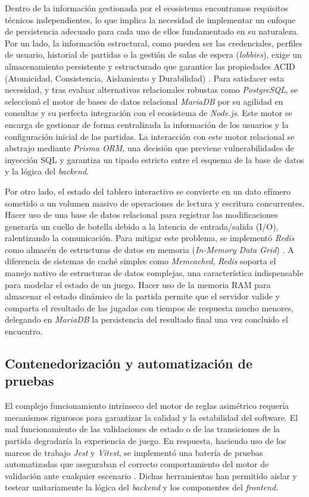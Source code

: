 Dentro de la información gestionada por el ecosistema encontramos requisitos técnicos independientes, lo que implica la necesidad de implementar un enfoque de persistencia adecuado para cada uno de ellos fundamentado en su naturaleza. Por un lado, la información estructural, como pueden ser las credenciales, perfiles de usuario, historial de partidas o la gestión de salas de espera (\textit{lobbies}), exige un almacenamiento persistente y estructurado que garantice las propiedades ACID (Atomicidad, Consistencia, Aislamiento y Durabilidad) \cite{elmasri_db}. Para satisfacer esta necesidad, y tras evaluar alternativas relacionales robustas como \textit{PostgreSQL}, se seleccionó el motor de bases de datos relacional \textit{MariaDB} por su agilidad en consultas y su perfecta integración con el ecosistema de \textit{Node.js}. Este motor se encarga de gestionar de forma centralizada la información de los usuarios y la configuración inicial de las partidas. La interacción con este motor relacional se abstrajo mediante \textit{Prisma ORM}, una decisión que previene vulnerabilidades de inyección SQL y garantiza un tipado estricto entre el esquema de la base de datos y la lógica del \textit{backend}.

Por otro lado, el estado del tablero interactivo se convierte en un dato efímero sometido a un volumen masivo de operaciones de lectura y escritura concurrentes. Hacer uso de una base de datos relacional para registrar las modificaciones generaría un cuello de botella debido a la latencia de entrada/salida (I/O), ralentizando la comunicación. Para mitigar este problema, se implementó \textit{Redis} como almacén de estructuras de datos en memoria (\textit{In-Memory Data Grid}) \cite{carlson_redis}. A diferencia de sistemas de caché simples como \textit{Memcached}, \textit{Redis} soporta el manejo nativo de estructuras de datos complejas, una característica indispensable para modelar el estado de un juego. Hacer uso de la memoria RAM para almacenar el estado dinámico de la partida permite que el servidor valide y comparta el resultado de las jugadas con tiempos de respuesta mucho menores, delegando en \textit{MariaDB} la persistencia del resultado final una vez concluido el encuentro.

\subsection{Contenedorización y automatización de pruebas}

El complejo funcionamiento intrínseco del motor de reglas asimétrico requería mecanismos rigurosos para garantizar la calidad y la estabilidad del software. El mal funcionamiento de las validaciones de estado o de las transiciones de la partida degradaría la experiencia de juego. En respuesta, haciendo uso de los marcos de trabajo \textit{Jest} y \textit{Vitest}, se implementó una batería de pruebas automatizadas que aseguraban el correcto comportamiento del motor de validación ante cualquier escenario \cite{myers_testing}. Dichas herramientas han permitido aislar y testear unitariamente la lógica del \textit{backend} y los componentes del \textit{frontend}.


